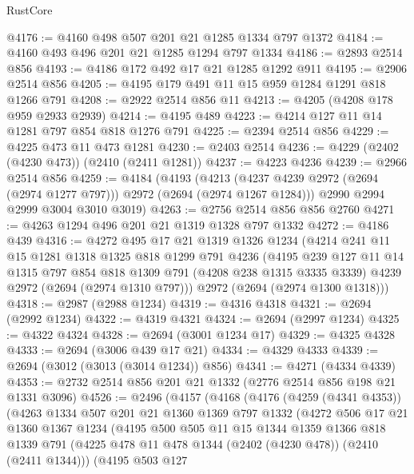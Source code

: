 \begin{lexlean}{RustCore}
\begin{coremodule}
@4176 := @4160 @498 @507 @201 @21 @1285 @1334 @797 @1372
@4184 := @4160 @493 @496 @201 @21 @1285 @1294 @797 @1334
@4186 := @2893 @2514 @856
@4193 := @4186 @172 @492 @17 @21 @1285 @1292 @911
@4195 := @2906 @2514 @856
@4205 := @4195 @179 @491 @11 @15 @959 @1284 @1291 @818 @1266 @791
@4208 := @2922 @2514 @856 @11
@4213 := @4205 (@4208 @178 @959 @2933 @2939)
@4214 := @4195 @489
@4223 := @4214 @127 @11 @14 @1281 @797 @854 @818 @1276 @791
@4225 := @2394 @2514 @856
@4229 := @4225 @473 @11 @473 @1281
@4230 := @2403 @2514
@4236 := @4229 (@2402 (@4230 @473)) (@2410 (@2411 @1281))
@4237 := @4223 @4236
@4239 := @2966 @2514 @856
@4259 := @4184
    (@4193
      (@4213 (@4237 @4239 @2972 (@2694 (@2974 @1277 @797))) @2972 (@2694 (@2974 @1267 @1284)))
      @2990
      @2994
      @2999
      @3004
      @3010
      @3019)
@4263 := @2756 @2514 @856 @856 @2760
@4271 := @4263 @1294 @496 @201 @21 @1319 @1328 @797 @1332
@4272 := @4186 @439
@4316 := @4272
    @495
    @17
    @21
    @1319
    @1326
    @1234
    (@4214
      @241
      @11
      @15
      @1281
      @1318
      @1325
      @818
      @1299
      @791
      @4236
      (@4195
        @239
        @127
        @11
        @14
        @1315
        @797
        @854
        @818
        @1309
        @791
        (@4208 @238 @1315 @3335 @3339)
        @4239
        @2972
        (@2694 (@2974 @1310 @797)))
      @2972
      (@2694 (@2974 @1300 @1318)))
@4318 := @2987 (@2988 @1234)
@4319 := @4316 @4318
@4321 := @2694 (@2992 @1234)
@4322 := @4319 @4321
@4324 := @2694 (@2997 @1234)
@4325 := @4322 @4324
@4328 := @2694 (@3001 @1234 @17)
@4329 := @4325 @4328
@4333 := @2694 (@3006 @439 @17 @21)
@4334 := @4329 @4333
@4339 := @2694 (@3012 (@3013 (@3014 @1234)) @856)
@4341 := @4271 (@4334 @4339)
@4353 := @2732 @2514 @856 @201 @21 @1332 (@2776 @2514 @856 @198 @21 @1331 @3096)
@4526 := @2496
    (@4157
      (@4168
        (@4176
          (@4259 (@4341 @4353))
          (@4263
            @1334
            @507
            @201
            @21
            @1360
            @1369
            @797
            @1332
            (@4272
              @506
              @17
              @21
              @1360
              @1367
              @1234
              (@4195
                @500
                @505
                @11
                @15
                @1344
                @1359
                @1366
                @818
                @1339
                @791
                (@4225 @478 @11 @478 @1344 (@2402 (@4230 @478)) (@2410 (@2411 @1344)))
                (@4195
                  @503
                  @127

\end{coremodule}
\end{lexlean}
